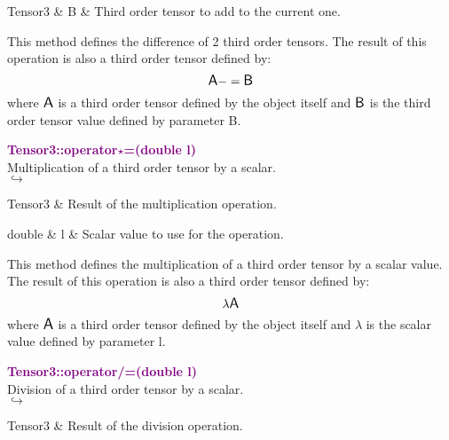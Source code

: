 \begin{tcolorbox}[width=\textwidth,myArgs,tabularx={ll|R}]
Tensor3 & B & Third order tensor to add to the current one.
\end{tcolorbox}

This method defines the difference of 2 third order tensors.
The result of this operation is also a third order tensor defined by:
\begin{equation*}
\mbox{\large\ensuremath{\mathsf{A}}} -= \mbox{\large\ensuremath{\mathsf{B}}}
\end{equation*}
where $\mbox{\large\ensuremath{\mathsf{A}}}$ is a third order tensor defined by the object itself and $\mbox{\large\ensuremath{\mathsf{B}}}$ is the third order tensor value defined by parameter B.

\textcolor{purple}{\textbf{Tensor3::operator$\star$=(double l)}}\label{Tensor3::operator*=(double l)}\\
Multiplication of a third order tensor by a scalar.\\ \hspace*{5mm}$\hookrightarrow$
\vspace*{-2em}\begin{tcolorbox}[grow to left by=-1cm, width=\textwidth-1cm,myArgs,tabularx={l|R}]
Tensor3 & Result of the multiplication operation.
\end{tcolorbox}

\begin{tcolorbox}[width=\textwidth,myArgs,tabularx={ll|R}]
double & l & Scalar value to use for the operation.
\end{tcolorbox}

This method defines the multiplication of a third order tensor by a scalar value.
The result of this operation is also a third order tensor defined by:
\begin{equation*}
\lambda \mbox{\large\ensuremath{\mathsf{A}}}
\end{equation*}
where $\mbox{\large\ensuremath{\mathsf{A}}}$ is a third order tensor defined by the object itself and $\lambda$ is the scalar value defined by parameter l.

\textcolor{purple}{\textbf{Tensor3::operator/=(double l)}}\label{Tensor3::operator/=(double l)}\\
Division of a third order tensor by a scalar.\\ \hspace*{5mm}$\hookrightarrow$
\vspace*{-2em}\begin{tcolorbox}[grow to left by=-1cm, width=\textwidth-1cm,myArgs,tabularx={l|R}]
Tensor3 & Result of the division operation.
\end{tcolorbox}

